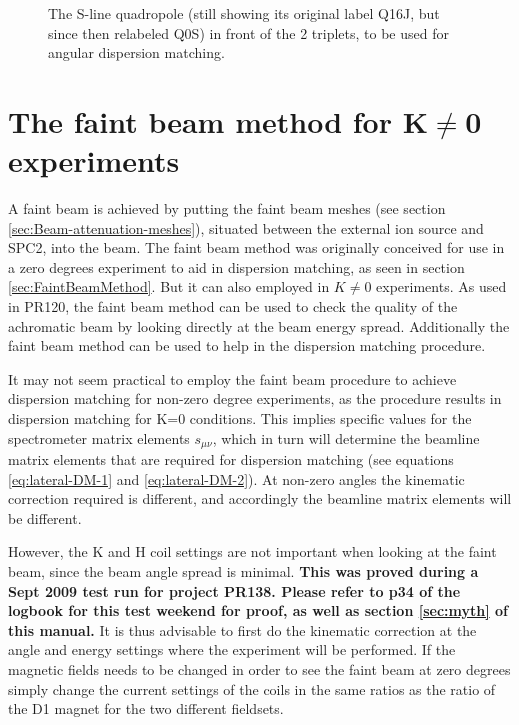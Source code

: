 \documentclass[11pt]{report}
\begin{document}
\begin{figure}[!ht]
\centerline{\vspace{0cm}\hspace{0cm}
}
\centering
\caption{The S-line quadropole (still showing its original label Q16J, but since then relabeled Q0S) 
in front of the 2 triplets, to be used for angular dispersion matching.}
\label{fig:quad-ang-disp-match}
\end{figure} 





\section{The faint beam method for K$\ne$0 experiments}\label{sec:FaintBeamMethodAchromatic}

A faint beam is achieved by putting 
the faint beam meshes (see section \ref{sec:Beam-attenuation-meshes}),
situated between the external ion source and SPC2, into the beam. The faint
beam method was originally conceived for use in a zero degrees experiment to aid in dispersion
matching, as seen in section \ref{sec:FaintBeamMethod}. 
But it can also employed in $K\neq0$ experiments.
As used in PR120, the faint beam method can be used to check the quality 
of the achromatic beam by looking directly at the beam energy spread.
Additionally the faint beam method can be used to help in the dispersion matching procedure.

It may not seem practical to employ the faint beam procedure to achieve dispersion
matching for non-zero degree experiments, as the procedure results in
dispersion matching for K=0 conditions. This implies specific values for
the spectrometer matrix elements $s_{\mu\nu}$, which in turn will determine the
beamline matrix elements that are required for dispersion matching (see equations
\ref{eq:lateral-DM-1} and \ref{eq:lateral-DM-2}).
At non-zero angles the kinematic correction required is different, and accordingly
the beamline matrix elements will be different.

However,
the K and H coil settings are not important when looking
at the faint beam, since the beam angle spread is minimal.
{\bf This was proved during a Sept 2009 test run for project PR138.
Please refer to p34 of the logbook for this test weekend for proof, as well as
section \ref{sec:myth} of this manual.}
It is thus advisable to first do the kinematic correction at the angle
and energy settings where the experiment will be performed. If the magnetic
fields needs to be changed in order to see the faint beam at zero degrees
simply change the current settings of the coils in the same ratios as the 
ratio of the D1 magnet for the two different fieldsets.%
\end{document}
